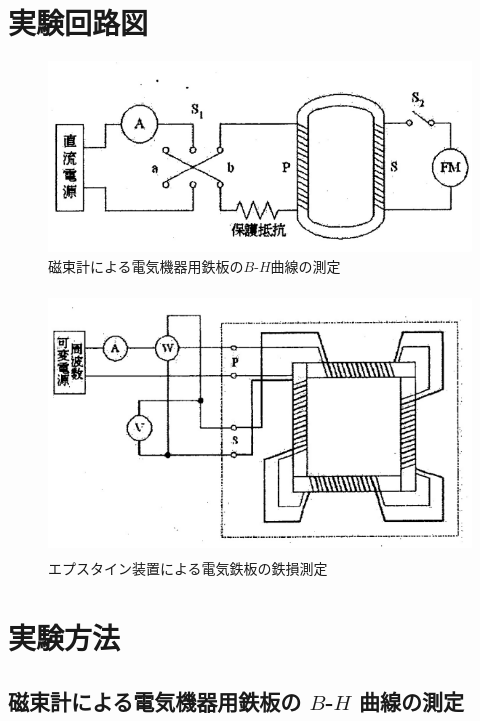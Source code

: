 \section{実験回路図}
\begin{figure}[H]
  \centering
  \includegraphics[width=13cm]{./fig/1.png}
  \caption{磁束計による電気機器用鉄板の$B$-$H$曲線の測定}
\end{figure}

\begin{figure}[H]
  \centering
  \includegraphics[height=7cm]{./fig/2.png}
  \caption{エプスタイン装置による電気鉄板の鉄損測定}
\end{figure}

\section{実験方法}
\subsection{磁束計による電気機器用鉄板の $B$-$H$ 曲線の測定}
